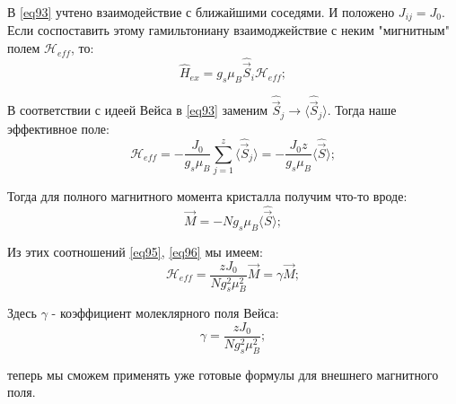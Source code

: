 \documentclass[a4paper, 14pt, russian]{article}
\newcommand{\be}{\begin{equation}}
\newcommand{\ee}{\end{equation}}
\begin{document}
	В \ref{eq93} учтено взаимодействие с ближайшими соседями. И положено
	$J_{ij} = J_0$. Если соспоставить этому гамильтониану взаимоджействие 
	с неким "мигнитным" полем $\mathcal{H}_{eff}$, то:
	\be
		\label{eq94}
		\hat{H}_{ex} = g_s \mu_B \hat{\vec S}_i \mathcal{H}_{eff};
	\ee

	В соответствии с идеей Вейса в \ref{eq93} заменим $\hat{\vec S}_j 
	\rightarrow \langle \hat{\vec S}_j \rangle$. Тогда наше эффективное 
	поле:
	\be
		\label{eq95}
		\mathcal{H}_{eff}  = -\frac{J_0}{g_s\mu_B} \sum_{j=1}^z
		 \langle \hat{\vec S}_j \rangle = -\frac{J_0 z}{g_s\mu_B}
		 \langle \hat{\vec S} \rangle;
	\ee

	Тогда для полного магнитного момента кристалла получим что-то вроде:
	\be
		\label{eq96}
		\vec M = - N g_s \mu_B \langle \hat{\vec S} \rangle;
	\ee

	Из этих соотношений \ref{eq95}, \ref{eq96} мы имеем:
	\be
		\label{eq97}
		\mathcal{H}_{eff} =  \frac{zJ_0}{N g_s^2 \mu_B^2} \vec M = \gamma \vec M;
	\ee

	Здесь $\gamma$ - коэффициент молеклярного поля Вейса:
	\be
		\gamma = \frac{zJ_0}{N g_s^2 \mu_B^2};
	\ee

	теперь мы сможем применять уже готовые формулы для внешнего магнитного поля.
\end{document}

